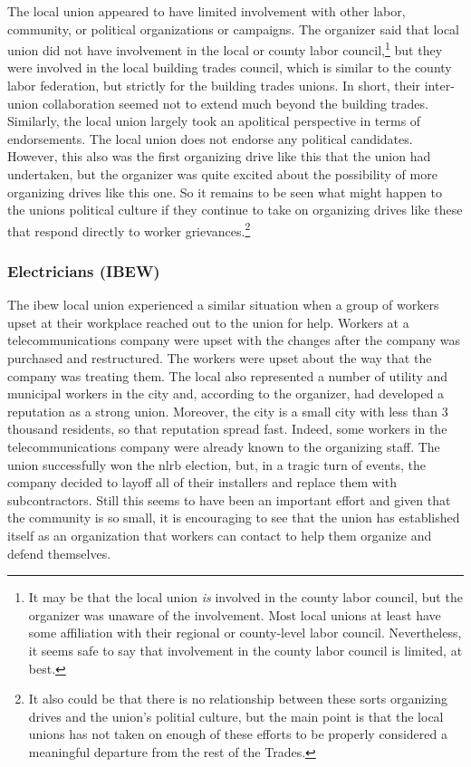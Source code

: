 \documentclass[12pt]{article}
\begin{document}
The local union appeared to have limited involvement with other labor, community, or political organizations or campaigns. The organizer said that local union did not have involvement in the local or county labor council,\footnote{It may be that the local union \emph{is} involved in the county labor council, but the organizer was unaware of the involvement. Most local unions at least have some affiliation with their regional or county-level labor council. Nevertheless, it seems safe to say that involvement in the county labor council is limited, at best.} but they were involved in the local building trades council, which is similar to the county labor federation, but strictly for the building trades unions. In short, their inter-union collaboration seemed not to extend much beyond the building trades. Similarly, the local union largely took an apolitical perspective in terms of endorsements. The local union does not endorse any political candidates. However, this also was the first organizing drive like this that the union had undertaken, but the organizer was quite excited about the possibility of more organizing drives like this one. So it remains to be seen what might happen to the unions political culture if they continue to take on organizing drives like these that respond directly to worker grievances.\footnote{It also could be that there is no relationship between these sorts organizing drives and the union's politial culture, but the main point is that the local unions has not taken on enough of these efforts to be properly considered a meaningful departure from the rest of the Trades.}

\subsubsection{Electricians (IBEW)}

The \acrshort{ibew} local union experienced a similar situation when a group of workers upset at their workplace reached out to the union for help. Workers at a telecommunications company were upset with the changes after the company was purchased and restructured. The workers were upset about the way that the company was treating them. The local also represented a number of utility and municipal workers in the city and, according to the organizer, had developed a reputation as a strong union. Moreover, the city is a small city with less than 3 thousand residents, so that reputation spread fast. Indeed, some workers in the telecommunications company were already known to the organizing staff. The union successfully won the \acrshort{nlrb} election, but, in a tragic turn of events, the company decided to layoff all of their installers and replace them with subcontractors. Still this seems to have been an important effort and given that the community is so small, it is encouraging to see that the union has established itself as an organization that workers can contact to help them organize and defend themselves.
\end{document}
